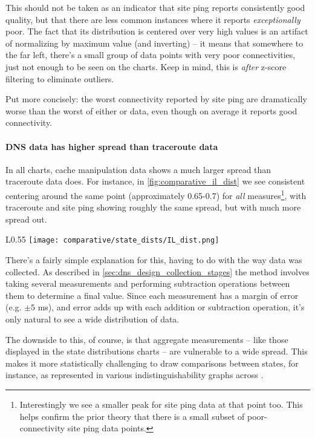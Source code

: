 This should not be taken as an indicator that site ping reports consistently good quality, but that there are less common instances where it reports \textit{exceptionally} poor. The fact that its distribution is centered over very high values is an artifact of normalizing by maximum value (and inverting) -- it means that somewhere to the far left, there's a small group of data points with very poor connectivities, just not enough to be seen on the \kde charts. Keep in mind, this is \textit{after} z-score filtering to eliminate outliers.

Put more concisely: the worst connectivity reported by site ping are dramatically worse than the worst of either \dns or \caida data, even though on average it reports good connectivity.

\paragraph{DNS data has higher spread than traceroute data} In all charts, \dns cache manipulation data shows a much larger spread than traceroute data does. For instance, in \cref{fig:comparative_il_dist} we see consistent centering around the same point (approximately 0.65-0.7) for \textit{all} measures\footnote{Interestingly we see a smaller peak for site ping data at that point too. This helps confirm the prior theory that there is a small subset of poor-connectivity site ping data points.}, with traceroute and site ping showing roughly the same spread, but with \dns much more spread out.

\begin{wrapfigure}[17]{L}{0.55\textwidth}
    \centering
    \texttt{[image: comparative/state\_dists/IL\_dist.png]}
    \caption{Illinois data distributions}
    \label{fig:comparative_il_dist}
\end{wrapfigure}

There's a fairly simple explanation for this, having to do with the way data was collected. As described in \cref{sec:dns_design_collection_stages} the \dns method involves taking several measurements and performing subtraction operations between them to determine a final value. Since each measurement has a margin of error (e.g. $\pm5$ ms), and error adds up with each addition or subtraction operation, it's only natural to see a wide distribution of data.

The downside to this, of course, is that aggregate measurements -- like those displayed in the state distributions charts -- are vulnerable to a wide spread. This makes it more statistically challenging to draw comparisons between states, for instance, as represented in various indistinguishability graphs across .

